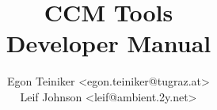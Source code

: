 \documentclass{book}
\author{
  Egon Teiniker <egon.teiniker@tugraz.at>\\
  Leif Johnson <leif@ambient.2y.net>
}
\title{{\Huge CCM Tools}\\Developer Manual}
\begin{document}

\maketitle
\tableofcontents








\begin{appendix}

\end{appendix}




\end{document}
